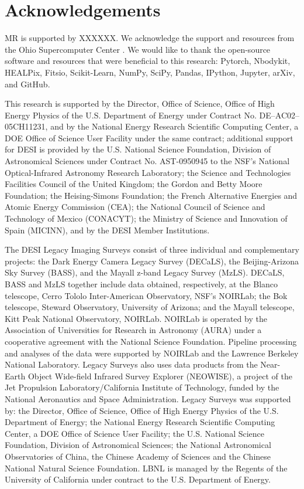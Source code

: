 \section*{Acknowledgements}
MR is supported by XXXXXX. We acknowledge the support and resources from the Ohio Supercomputer Center \citep[OSC;][]{OhioSupercomputerCenter1987}. We would like to thank the open-source software and resources that were beneficial to this research: Pytorch, Nbodykit, HEALPix, Fitsio, Scikit-Learn, NumPy, SciPy, Pandas, IPython, Jupyter, arXiv, and GitHub. 


This research is supported by the Director, Office of Science, Office of High Energy Physics of the U.S. Department of Energy under Contract No. DE–AC02–05CH11231, and by the National Energy Research Scientific Computing Center, a DOE Office of Science User Facility under the same contract; additional support for DESI is provided by the U.S. National Science Foundation, Division of Astronomical Sciences under Contract No. AST-0950945 to the NSF’s National Optical-Infrared Astronomy Research Laboratory; the Science and Technologies Facilities Council of the United Kingdom; the Gordon and Betty Moore Foundation; the Heising-Simons Foundation; the French Alternative Energies and Atomic Energy Commission (CEA); the National Council of Science and Technology of Mexico (CONACYT); the Ministry of Science and Innovation of Spain (MICINN), and by the DESI Member Institutions.

The DESI Legacy Imaging Surveys consist of three individual and complementary projects: the Dark Energy Camera Legacy Survey (DECaLS), the Beijing-Arizona Sky Survey (BASS), and the Mayall z-band Legacy Survey (MzLS). DECaLS, BASS and MzLS together include data obtained, respectively, at the Blanco telescope, Cerro Tololo Inter-American Observatory, NSF’s NOIRLab; the Bok telescope, Steward Observatory, University of Arizona; and the Mayall telescope, Kitt Peak National Observatory, NOIRLab. NOIRLab is operated by the Association of Universities for Research in Astronomy (AURA) under a cooperative agreement with the National Science Foundation. Pipeline processing and analyses of the data were supported by NOIRLab and the Lawrence Berkeley National Laboratory. Legacy Surveys also uses data products from the Near-Earth Object Wide-field Infrared Survey Explorer (NEOWISE), a project of the Jet Propulsion Laboratory/California Institute of Technology, funded by the National Aeronautics and Space Administration. Legacy Surveys was supported by: the Director, Office of Science, Office of High Energy Physics of the U.S. Department of Energy; the National Energy Research Scientific Computing Center, a DOE Office of Science User Facility; the U.S. National Science Foundation, Division of Astronomical Sciences; the National Astronomical Observatories of China, the Chinese Academy of Sciences and the Chinese National Natural Science Foundation. LBNL is managed by the Regents of the University of California under contract to the U.S. Department of Energy. 

